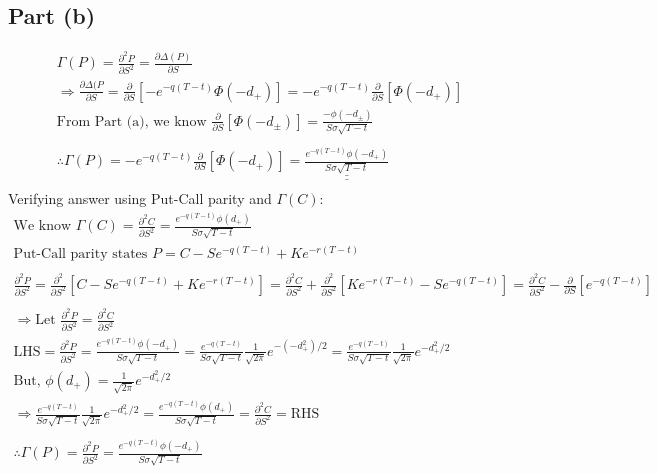 \documentclass[letterpaper,10pt]{article}
\newcommand{\doubleu}[1]{\underline{\underline{#1}}}
\newcommand{\partiald}[2]{\frac{\partial #1}{\partial #2}}
\begin{document}
		\subsection{Part (b)}
			\begin{gather*}
				\Gamma(P) = \partiald{^2P}{S^2} = \partiald{\Delta(P)}{S} \\
				\Rightarrow \partiald{\Delta(P}{S} = \partiald{}{S}\left[ -e^{-q(T-t)} \Phi(-d_+) \right] = -e^{-q(T-t)} \partiald{}{S}\left[ \Phi(-d_+) \right] \\
				\text{From Part (a), we know } \partiald{}{S}\left[ \Phi(-d_\pm) \right] = \frac{-\phi (-d_\pm)}{S \sigma\sqrt{T-t}} \\
				\\
				\therefore \Gamma(P) = -e^{-q(T-t)} \partiald{}{S}\left[ \Phi(-d_+) \right] = \doubleu{\frac{e^{-q(T-t)} \phi(-d_+)}{S\sigma \sqrt{T-t}}}
				\\
			\end{gather*}
			Verifying answer using Put-Call parity and $\Gamma(C)$:
			\begin{gather*}
				\text{We know } \Gamma(C) = \partiald{^2C}{S^2} = \frac{e^{-q(T-t)} \phi(d_+)}{S\sigma\sqrt{T-t}} \\
				\text{Put-Call parity states } P = C - Se^{-q(T-t)} + Ke^{-r(T-t)} \\
				\\
				\partiald{^2P}{S^2} = \partiald{^2}{S^2}\left[ C - Se^{-q(T-t)} + Ke^{-r(T-t)} \right] = \partiald{^2C}{S^2} + \partiald{^2}{S^2}\left[Ke^{-r(T-t)} - Se^{-q(T-t)} \right] = \partiald{^2C}{S^2} - \partiald{}{S}\left[e^{-q(T-t)}\right] \\
				\\
				\Rightarrow \text{Let } \partiald{^2P}{S^2} = \partiald{^2C}{S^2} \\
				\text{LHS} = \partiald{^2P}{S^2} = \frac{e^{-q(T-t)} \phi(-d_+)}{S\sigma \sqrt{T-t}} = \frac{e^{-q(T-t)}}{S\sigma \sqrt{T-t}} \frac{1}{\sqrt{2\pi}}e^{-(-d_+^2)/2} = \frac{e^{-q(T-t)}}{S\sigma \sqrt{T-t}} \frac{1}{\sqrt{2\pi}}e^{-d_+^2/2} \\
				\text{But, } \phi(d_+) = \frac{1}{\sqrt{2\pi}} e^{-d_+^2/2} \\
				\Rightarrow \frac{e^{-q(T-t)}}{S\sigma \sqrt{T-t}} \frac{1}{\sqrt{2\pi}}e^{-d_+^2/2} = \frac{e^{-q(T-t)} \phi(d_+)}{S\sigma \sqrt{T-t}} = \partiald{^2C}{S^2} = \text{RHS} \\
				\\
				\boxed{\therefore \Gamma(P) = \partiald{^2P}{S^2} = \frac{e^{-q(T-t)} \phi(-d_+)}{S\sigma\sqrt{T-t}}}
				\\
			\end{gather*}
\end{document}
